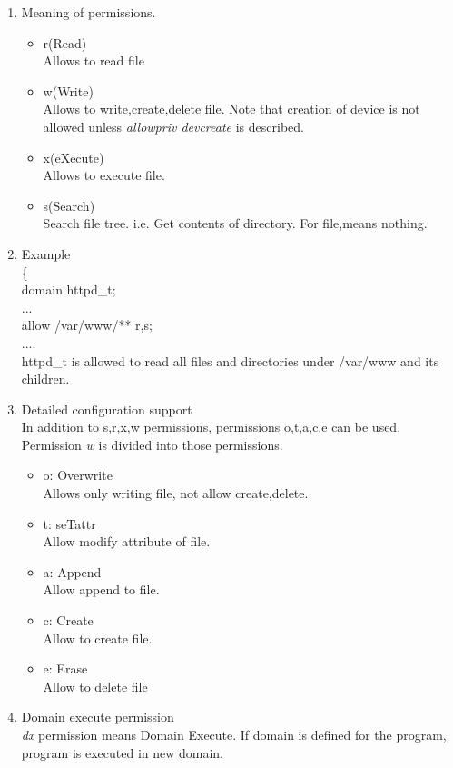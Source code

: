 \documentclass{article}
\begin{document}
\begin{enumerate}
  \item Meaning of permissions.
  \begin{itemize}
   \item r(Read)\\
	 Allows to read file
   \item w(Write)\\
	 Allows to write,create,delete file. Note that creation of
	 device is not allowed unless {\it allowpriv devcreate} is described.
   \item x(eXecute)\\
	 Allows to execute file.
   \item s(Search)\\ 
	 Search file tree. i.e. Get contents of directory. For file,means nothing.
  \end{itemize}
  \item Example\\
	\{\\
	domain httpd\_t;\\
	...\\
	allow /var/www/** r,s;\\
	....\\
	httpd\_t is allowed to read all files and directories under
	/var/www and its children.
  \item Detailed configuration support\\
	In addition to s,r,x,w permissions, permissions o,t,a,c,e
	can be used. Permission {\it w} is divided into those
	permissions.\\
	\begin{itemize}
	 \item o: Overwrite\\
	       Allows only writing file, not allow create,delete.
	 \item t: seTattr\\
	       Allow modify attribute of file.
	 \item a: Append\\
	       Allow append to file.
	 \item c: Create\\
	       Allow to create file.
	 \item e: Erase\\
	       Allow to delete file  
	\end{itemize}
  \item Domain execute permission\\
	{\it dx} permission means Domain Execute. If domain is defined
	for the program, program is executed in new domain.

\end{enumerate}
\end{document}
